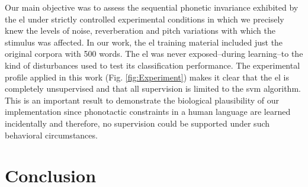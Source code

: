 \documentclass[10pt,letterpaper]{article}
\begin{document}
Our main objective was to assess the sequential phonetic invariance exhibited by the \gls{el} under strictly controlled experimental conditions in which we precisely knew the levels of noise, reverberation and pitch variations with which the stimulus was affected. In our work, the \gls{el} training material included just the original corpora with 500 words. The \gls{el} was never exposed--during learning--to the kind of disturbances used to test its classification performance. The experimental profile applied in this work (Fig. \ref{fig:Experiment}) makes it clear that the \gls{el} is completely unsupervised and that all supervision is limited to the \gls{svm} algorithm. This is an important result to demonstrate the biological plausibility of our implementation since phonotactic constraints in a human language are learned incidentally \cite{BRENT199693,saffran_1997} and therefore, no supervision could be supported under such behavioral circumstances.











\section*{Conclusion}


\end{document}
